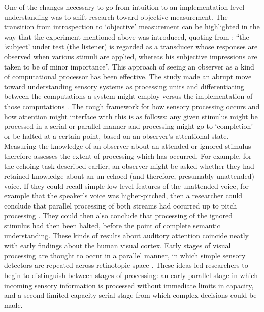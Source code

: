 One of the changes necessary to go from intuition to an implementation-level understanding was to shift research toward objective measurement. The transition from introspection to ‘objective’ measurement can be highlighted in the way that the experiment mentioned above was introduced, quoting from \citet{Cherry1953-as}: ``the `subject' under test (the listener) is regarded as a transducer whose responses are observed when various stimuli are applied, whereas his subjective impressions are taken to be of minor importance''. This approach of seeing an observer as a kind of computational processor has been effective. The study made an abrupt move toward understanding sensory systems as processing units and differentiating between the computations a system might employ versus the implementation of those computations \citep{Marr1982-fg}. The rough framework for how sensory processing occurs and how attention might interface with this is as follows: any given stimulus might be processed in a serial or parallel manner and processing might go to `completion' or be halted at a certain point, based on an observer's attentional state. Measuring the knowledge of an observer about an attended or ignored stimulus therefore assesses the extent of processing which has occurred. For example, for the echoing task described earlier, an observer might be asked whether they had retained knowledge about an un-echoed (and therefore, presumably unattended) voice. If they could recall simple low-level features of the unattended voice, for example that the speaker's voice was higher-pitched, then a researcher could conclude that parallel processing of both streams had occurred up to pitch processing \citep{Cherry1953-as}. They could then also conclude that processing of the ignored stimulus had then been halted, before the point of complete semantic understanding. These kinds of results about auditory attention coincide neatly with early findings about the human visual cortex. Early stages of visual processing are thought to occur in a parallel manner, in which simple sensory detectors are repeated across retinotopic space \citep{Kuffler1953-qw,Hubel1962-pn,Hubel1968-na}. These ideas led researchers to begin to distinguish between stages of processing: an early parallel stage in which incoming sensory information is processed without immediate limits in capacity, and a second limited capacity serial stage from which complex decisions could be made. 

